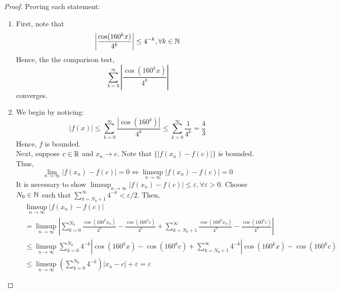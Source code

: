 \begin{proof}
    Proving each statement:
    \begin{enumerate}
        \item First, note that
            \begin{equation*}
                \left | \frac{\cos (160^k x)}{4^k}\right | \leq 4^{-k}, \forall k \in \mathbb{N}
            \end{equation*}
            Hence, the the comparison test, 
            \begin{equation*}
                \sum \limits_{k=0}^\infty \left | \frac{\cos (160^k x)}{4^k}\right |
            \end{equation*}
            converges.
        \item We begin by noticing:
        \begin{equation*}
            |f(x)| \leq \sum \limits_{k=0}^\infty \frac{|\cos (160^k)|}{4^k} \leq \sum \limits_{k=0}^\infty \frac{1}{4^k} = \frac{4}{3}
        \end{equation*}
        Hence, $f$ is bounded.\\
        Next, suppose $c \in \mathbb{R}$ and $x_n \to c$. Note that $\{|f(x_n) - f(c)|\}$ is bounded. Thus,
        \begin{equation*}
            \lim \limits_{n \to \infty} |f(x_n) - f(c)| = 0 \Longleftrightarrow \limsup \limits_{n \to \infty} |f(x_n) - f(c)| = 0
        \end{equation*}
        It is necessary to show $\limsup_{n \to \infty} |f(x_n) - f(c)| \leq \varepsilon, \forall \varepsilon > 0$. Choose $N_0 \in \mathbb{N}$ such that $\sum_{k=N_0 + 1}^\infty 4^{-k} < \varepsilon/2$. Then,
        \begin{align*}
            &\limsup \limits_{n \to \infty} |f(x_n) - f(c)| \\
            &= \limsup \limits_{n \to \infty} \left |
                \sum \limits_{k=0}^{N_0} \frac{\cos (160^k x_n)}{4^k} - \frac{\cos (160^k c)}{4^k} + 
                \sum \limits_{k=N_0 + 1}^\infty \frac{\cos (160^k x_n)}{4^k} - \frac{\cos (160^k c)}{4^k}
            \right | \\
            &\leq \limsup \limits_{n \to \infty} \sum \limits_{k = 0}^{N_0} 4^{-k} |\cos (160^k x) - \cos( 160^k c) + \sum \limits_{k = N_0 + 1}^\infty 4^{-k} |\cos (160^k x) - \cos( 160^k c) \\
            &\leq \limsup \limits_{n \to \infty} \left ( \sum \limits_{k=0}^{N_0} 4^{-k} \right ) |x_n - c| + \varepsilon = \varepsilon
        \end{align*}
    \end{enumerate}
\end{proof}

